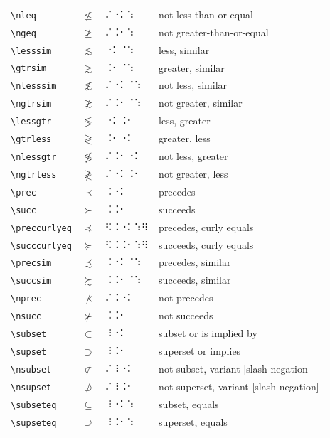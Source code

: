 \documentclass[oneside]{article}
\begin{document}
\begin{longtable}{llll}
\verb|\nleq| & $\nleq$ &   ⠌⠐⠅⠱   & {not less-than-or-equal} \\[2ex]
\verb|\ngeq| & $\ngeq$ &   ⠌⠨⠂⠱   & {not greater-than-or-equal} \\[2ex]
\verb|\lesssim| & $\lesssim$ &   ⠐⠅⠈⠱   & {less, similar} \\[2ex]
\verb|\gtrsim| & $\gtrsim$ &   ⠨⠂⠈⠱   & {greater, similar} \\[2ex]
\verb|\nlesssim| & $\nlesssim$ &   ⠌⠐⠅⠈⠱   & {not less, similar} \\[2ex]
\verb|\ngtrsim| & $\ngtrsim$ &   ⠌⠨⠂⠈⠱   & {not greater, similar} \\[2ex]
\verb|\lessgtr| & $\lessgtr$ &   ⠐⠅⠨⠂   & {less, greater} \\[2ex]
\verb|\gtrless| & $\gtrless$ &   ⠨⠂⠐⠅   & {greater, less} \\[2ex]
\verb|\nlessgtr| & $\nlessgtr$ &   ⠌⠨⠂⠐⠅   & {not less, greater} \\[2ex]
\verb|\ngtrless| & $\ngtrless$ &   ⠌⠐⠅⠨⠂   & {not greater, less} \\[2ex]
\verb|\prec| & $\prec$ &   ⠨⠐⠅   & {precedes} \\[2ex]
\verb|\succ| & $\succ$ &   ⠨⠨⠂   & {succeeds} \\[2ex]
\verb|\preccurlyeq| & $\preccurlyeq$ &   ⠫⠨⠐⠅⠱⠻   & {precedes, curly equals} \\[2ex]
\verb|\succcurlyeq| & $\succcurlyeq$ &   ⠫⠨⠨⠂⠱⠻   & {succeeds, curly equals} \\[2ex]
\verb|\precsim| & $\precsim$ &   ⠨⠐⠅⠈⠱   & {precedes, similar} \\[2ex]
\verb|\succsim| & $\succsim$ &   ⠨⠨⠂⠈⠱   & {succeeds, similar} \\[2ex]
\verb|\nprec| & $\nprec$ &   ⠌⠨⠐⠅   & {not precedes} \\[2ex]
\verb|\nsucc| & $\nsucc$ &   ⠨⠨⠂   & {not succeeds} \\[2ex]
\verb|\subset| & $\subset$ &   ⠸⠐⠅   & {subset or is implied by} \\[2ex]
\verb|\supset| & $\supset$ &   ⠸⠨⠂   & {superset or implies} \\[2ex]
\verb|\nsubset| & $\nsubset$ &   ⠌⠸⠐⠅   & {not subset, variant [slash negation]} \\[2ex]
\verb|\nsupset| & $\nsupset$ &   ⠌⠸⠨⠂   & {not superset, variant [slash negation]} \\[2ex]
\verb|\subseteq| & $\subseteq$ &   ⠸⠐⠅⠱   & {subset, equals} \\[2ex]
\verb|\supseteq| & $\supseteq$ &   ⠸⠨⠂⠱   & {superset, equals} \\[2ex]

\end{longtable}
\end{document}
